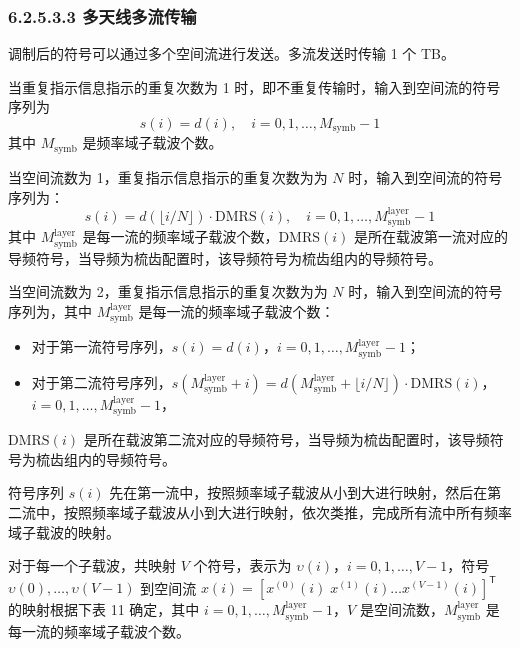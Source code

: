\documentclass[11pt,a4paper]{ctexart}
\begin{document}
\subsubsection{6.2.5.3.3 多天线多流传输}

调制后的符号可以通过多个空间流进行发送。多流发送时传输 1 个 TB。

当重复指示信息指示的重复次数为 1 时，即不重复传输时，输入到空间流的符号序列为
\begin{equation}
s(i) = d(i), \quad i = 0, 1, \ldots, M_{\mathrm{symb}} - 1
\end{equation}
其中 $M_{\mathrm{symb}}$ 是频率域子载波个数。

当空间流数为 1，重复指示信息指示的重复次数为为 $N$ 时，输入到空间流的符号序列为：
\begin{equation}
s(i) = d(\lfloor i/N \rfloor) \cdot \mathrm{DMRS}(i), \quad i = 0, 1, \ldots, M_{\mathrm{symb}}^{\mathrm{layer}} - 1
\end{equation}
其中 $M_{\mathrm{symb}}^{\mathrm{layer}}$ 是每一流的频率域子载波个数，$\mathrm{DMRS}(i)$ 是所在载波第一流对应的导频符号，当导频为梳齿配置时，该导频符号为梳齿组内的导频符号。

当空间流数为 2，重复指示信息指示的重复次数为为 $N$ 时，输入到空间流的符号序列为，其中 $M_{\mathrm{symb}}^{\mathrm{layer}}$ 是每一流的频率域子载波个数：
\begin{itemize}[nosep]
  \item 对于第一流符号序列，$s(i) = d(i)$，$i = 0, 1, \ldots, M_{\mathrm{symb}}^{\mathrm{layer}} - 1$；
  \item 对于第二流符号序列，$s(M_{\mathrm{symb}}^{\mathrm{layer}} + i) = d(M_{\mathrm{symb}}^{\mathrm{layer}} + \lfloor i/N \rfloor) \cdot \mathrm{DMRS}(i)$，$i = 0, 1, \ldots, M_{\mathrm{symb}}^{\mathrm{layer}} - 1$，
\end{itemize}
$\mathrm{DMRS}(i)$ 是所在载波第二流对应的导频符号，当导频为梳齿配置时，该导频符号为梳齿组内的导频符号。

符号序列 $s(i)$ 先在第一流中，按照频率域子载波从小到大进行映射，然后在第二流中，按照频率域子载波从小到大进行映射，依次类推，完成所有流中所有频率域子载波的映射。

对于每一个子载波，共映射 $V$ 个符号，表示为 $\upsilon(i)$，$i = 0, 1, \ldots, V - 1$，符号 $\upsilon(0), \ldots, \upsilon(V - 1)$ 到空间流 $x(i) = [x^{(0)}(i)\; x^{(1)}(i) \ldots x^{(V-1)}(i)]^{\mathsf T}$ 的映射根据下表 11 确定，其中 $i = 0, 1, \ldots, M_{\mathrm{symb}}^{\mathrm{layer}} - 1$，$V$ 是空间流数，$M_{\mathrm{symb}}^{\mathrm{layer}}$ 是每一流的频率域子载波个数。
\end{document}
